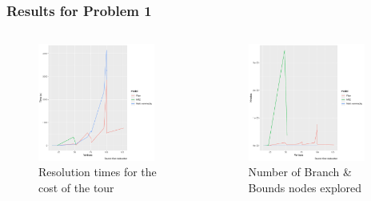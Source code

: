 \documentclass[aspectratio=169]{beamer}
\begin{document}
{\begin{frame}
\frametitle{Results for Problem 1}
\begin{columns}
\begin{figure}[ht]
\centering
\includegraphics[width=0.9\textwidth]{images/figure:5.pdf}
\caption{Resolution times for the cost of the tour}
\end{figure}
 

\begin{figure}[ht]
\centering
\includegraphics[width=0.9\textwidth]{images/figure:6.pdf}
\caption{Number of Branch \& Bounds nodes explored}
\end{figure}
\end{columns}
\end{frame}

}
\end{document}

